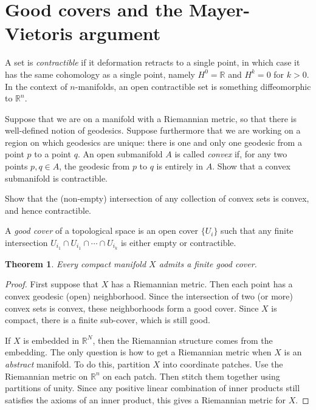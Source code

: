 \documentclass[12pt]{amsbook}
\newcommand{\R}{{\mathbb R}}
\newtheorem{thm}{Theorem}[section]
\theoremstyle{definition}
\begin{document}
 \section{Good covers and the Mayer-Vietoris argument}
 
 A set is {\em contractible} if it deformation retracts to a single point, in which case it has the same cohomology as a single 
 point, namely $H^0=\R$ and $H^k=0$ for $k>0$. In the context of $n$-manifolds, an open contractible set is something
 diffeomorphic to $\R^n$. 
 
 \smallskip
 
  Suppose that we are on a manifold with a Riemannian metric, so that there is well-defined notion
 of geodesics. Suppose furthermore that we are working on a region on which geodesics are unique: there is one and only one geodesic from a point $p$ to a point $q$. An open submanifold $A$ is called {\em convex} if, for any two points $p,q \in A$, the geodesic from $p$ to $q$ is entirely in $A$. Show that a convex submanifold is contractible. 
 
 \smallskip
 
  Show that the (non-empty) intersection of any collection of convex sets is convex, and hence 
 contractible. 
 
 \medskip
 
 A {\em good cover} of a topological space is an open cover $\{U_i\}$ such that any finite intersection
 $U_{i_1} \cap U_{i_1} \cap \cdots \cap U_{i_k}$ is either empty or contractible. 
 
 \begin{thm} Every compact manifold $X$ admits a finite good cover.  \end{thm}
 
 \begin{proof} First suppose that $X$ has a Riemannian metric. Then each point has a convex geodesic (open) 
 neighborhood. Since the 
 intersection of two (or more) convex sets is convex, these neighborhoods form a good cover. Since $X$ is compact, there
 is a finite sub-cover, which is still good. 
 
If $X$ is embedded in $\R^N$, then the Riemannian structure comes from the embedding. 
The only question is how to get a Riemannian metric when $X$ is an {\em abstract} manifold. To do this, partition $X$ into
coordinate patches. Use the Riemannian metric on $\R^n$ on each patch. Then stitch them together using partitions
of unity. Since any positive linear combination of inner products still satisfies the axioms of an inner product, this gives a 
Riemannian metric for $X$.
\end{proof}
\end{document}
